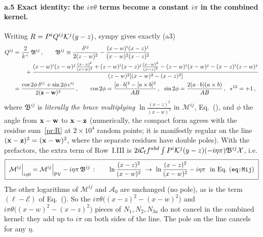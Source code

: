 \paragraph{a.5 Exact identity: the $i\pi\theta$ terms become a constant $i\pi$ in the combined kernel.} Writing $R=P^iQ^{ij}\mathcal{K}^j(y-z)$, sympy gives exactly (a3)
\begin{align}\label{pr:QB}
Q^{ij}&=\frac{2}{k^+}\,\mathfrak B^{ij}\,,\qquad
\mathfrak B^{ij}\equiv\frac{\delta^{ij}}{2(z-w)^2}-\frac{(x-w)^i(x-z)^j}{(x-w)^2(x-z)^2}\notag\\&\qquad+\frac{(x-w)^i(z-w)^j\frac{(x-z)^2}{(x-w)^2}+(z-w)^i(x-z)^j\frac{(x-w)^2}{(x-z)^2}-(z-w)^i(x-w)^j-(x-z)^i(z-w)^j}{(z-w)^2[(x-w)^2-(x-z)^2]}\notag\\
&=\frac{\cos2\phi\,\delta^{ij}+\sin2\phi\,\epsilon^{ij}}{2(\v z-\v w)^2}\,,\qquad \cos2\phi=\frac{[a\cdot b]^2-[a\times b]^2}{AB}\,,\ \ \sin2\phi=\frac{2(a\cdot b)(a\times b)}{AB}\,,\ \ \epsilon^{12}=+1\,,
\end{align}
where $\mathfrak B^{ij}$ is \emph{literally the brace multiplying} $\ln\frac{(x-z)^2}{(x-w)^2}$ in $\mathcal M^{ij}$, Eq.~(), and $\phi$ the angle from $\mathbf{x}-\mathbf{w}$ to $\mathbf{x}-\mathbf{z}$ (numerically, the compact form agrees with the residue sum~\eqref{pr:R} at $2\times10^4$ random points; it is manifestly regular on the line $(\mathbf{x}-\mathbf{z})^2=(\mathbf{x}-\mathbf{w})^2$, where the separate residues have double poles). With the prefactors, the extra term of Row~I.III is $2i\mathcal C_{\rm f}f^{abd}\int P^i\mathcal{K}^j(y-z)(-i\eta\pi)\mathfrak B^{ij}\mathcal X$, i.e.
\begin{align}\label{pr:shift}
\boxed{\ \mathcal M^{ij}\Big|_{i\eta0}=\mathcal M^{ij}\Big|_{\rm PV}-i\eta\pi\,\mathfrak B^{ij}\,:\qquad \ln\frac{(x-z)^2}{(x-w)^2}\ \to\ \ln\frac{(x-z)^2}{(x-w)^2}-i\eta\pi\ \text{ in Eq.~(\dref{eq:Mij})}\ }
\end{align}
The other logarithms of $\mathcal M^{ij}$ and $\mathcal A_0$ are unchanged (no pole), as is the term $(\ell-\mathcal E)$ of Eq.~(). So the $i\pi\theta\big((x-z)^2-(x-w)^2\big)$ and $i\pi\theta\big((x-w)^2-(x-z)^2\big)$ pieces of $N_1,N_2,N_{3a}$ do not cancel in the combined kernel: they add up to $i\pi$ on both sides of the line. The pole on the line cancels for any $\eta$.

